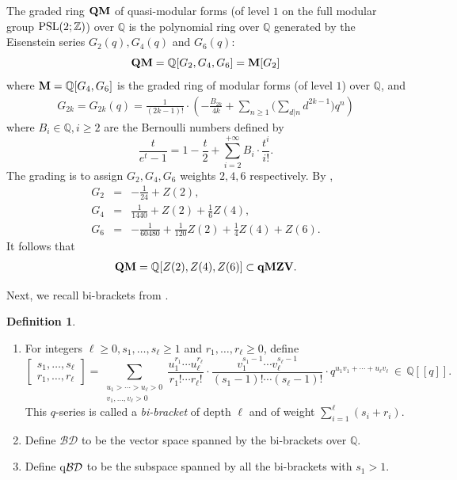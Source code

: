 \documentclass[12pt, reqno]{amsart}
\theoremstyle{definition}
\newtheorem{definition}[theorem]{Definition}
\theoremstyle{remark}
\numberwithin{equation}{section}
\newcommand{\BD}{\mathcal {BD}}
\newcommand{\Q}{ \mathbb Q }
\newcommand{\qBD}{{\rm q}{\mathcal {BD}}}
\newcommand{\qMZV}{ {\bf qMZV} }
\newcommand{\Z}{ \mathbb Z }
\numberwithin{equation}{section}
\begin{document}
The graded ring ${\bf QM}$ of quasi-modular forms (of level $1$  
on the full modular group ${\rm PSL}(2; \Z)$) over $\Q$ is 
the polynomial ring over $\Q$ generated by the Eisenstein series 
$G_2(q), G_4(q)$ and $G_6(q)$:
$$
{\bf QM} = \Q[G_2, G_4, G_6] = {\bf M}[G_2]
$$
where ${\bf M} = \Q[G_4, G_6]$ is the graded ring of modular forms 
(of level $1$) over $\Q$, and 
\begin{eqnarray*}    
G_{2k} = G_{2k}(q) =\frac{1}{(2k-1)!} \cdot 
\left (-\frac{B_{2k}}{4k} + \sum_{n \ge 1} 
\Big ( \sum_{d|n} d^{2k-1} \Big )q^n \right )
\end{eqnarray*}
where $B_i \in \Q, i \ge 2$ are the Bernoulli numbers defined by 
$$
\frac{t}{e^t - 1} = 1 - \frac{t}{2} + \sum_{i =2}^{+\infty} B_i \cdot \frac{t^i}{i!}.
$$
The grading is to assign $G_2, G_4, G_6$ weights $2, 4, 6$ respectively.
By \cite[p.6]{BK3}, 
\begin{eqnarray*}
G_2 &=& -\frac{1}{24} + Z(2),      \\
G_4 &=& \frac{1}{1440} + Z(2) + \frac{1}{6}Z(4),     \\
G_6 &=& -\frac{1}{60480} + \frac{1}{120} Z(2) + \frac{1}{4} Z(4) + Z(6).
\end{eqnarray*}
It follows that
\begin{eqnarray}  \label{20170812522pm} 
{\bf QM} = \Q[Z(2), Z(4), Z(6)] \subset \qMZV.
\end{eqnarray}

Next, we recall bi-brackets from \cite{Bac, BK2}.

\begin{definition}   \label{def-BiBracket}
\begin{enumerate}
\item[{\rm (i)}] 
For integers $\ell \ge 0, s_1, \ldots, s_\ell \ge 1$ and 
$r_1, \ldots, r_\ell \ge 0$, define
$$
  \begin{bmatrix} s_1, \ldots, s_\ell\\r_1, \ldots, r_\ell \end{bmatrix}
= \sum_{\substack{u_1 > \cdots > u_\ell > 0\\v_1, \ldots, v_\ell > 0}}
\frac{u_1^{r_1} \cdots u_\ell^{r_\ell}}{r_1! \cdots r_\ell!} \cdot
\frac{v_1^{s_1-1} \cdots v_\ell^{s_\ell-1}}{(s_1-1)! \cdots (s_\ell-1)!} 
\cdot q^{u_1v_1 + \cdots + u_\ell v_\ell} \, \in \, \Q[[q]].
$$
This $q$-series is called a {\it bi-bracket} of depth $\ell$ and of weight 
$\sum_{i=1}^\ell (s_i +r_i)$.

\item[{\rm (ii)}] 
Define $\BD$ to be the vector space spanned by the bi-brackets 
over $\Q$.

\item[{\rm (iii)}] 
Define $\qBD$ to be the subspace spanned by all the
bi-brackets with $s_1 > 1$. 
%
\end{enumerate}
\end{definition}
\end{document}

